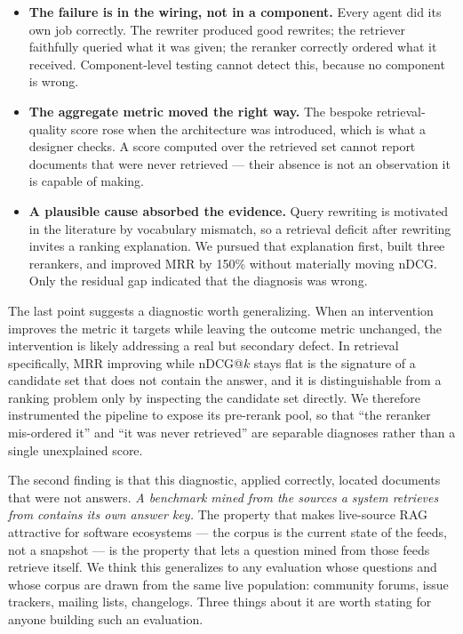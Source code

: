 \documentclass[acmsmall,review,anonymous,screen]{acmart}
\begin{document}
\begin{itemize}
  \item \textbf{The failure is in the wiring, not in a component.} Every agent
  did its own job correctly. The rewriter produced good rewrites; the retriever
  faithfully queried what it was given; the reranker correctly ordered what it
  received. Component-level testing cannot detect this, because no component is
  wrong.

  \item \textbf{The aggregate metric moved the right way.} The bespoke
  retrieval-quality score rose when the architecture was introduced, which is
  what a designer checks. A score computed over the retrieved set cannot report
  documents that were never retrieved --- their absence is not an observation it
  is capable of making.

  \item \textbf{A plausible cause absorbed the evidence.} Query rewriting is
  motivated in the literature by vocabulary mismatch, so a retrieval deficit
  after rewriting invites a ranking explanation. We pursued that explanation
  first, built three rerankers, and improved MRR by 150\% without materially
  moving nDCG. Only the residual gap indicated that the diagnosis was wrong.
\end{itemize}

The last point suggests a diagnostic worth generalizing. When an intervention
improves the metric it targets while leaving the outcome metric unchanged, the
intervention is likely addressing a real but secondary defect. In retrieval
specifically, MRR improving while nDCG@$k$ stays flat is the
signature of a candidate set that does not contain the answer, and it is
distinguishable from a ranking problem only by inspecting the candidate set
directly. We therefore instrumented the pipeline to expose its pre-rerank pool,
so that ``the reranker mis-ordered it'' and ``it was never retrieved'' are
separable diagnoses rather than a single unexplained score.

The second finding is that this diagnostic, applied correctly, located
documents that were not answers. \emph{A benchmark mined from the sources a
system retrieves from contains its own answer key.} The property that makes
live-source RAG attractive for software ecosystems --- the corpus is the
current state of the feeds, not a snapshot --- is the property that lets a
question mined from those feeds retrieve itself. We think this generalizes to
any evaluation whose questions and whose corpus are drawn from the same live
population: community forums, issue trackers, mailing lists, changelogs. Three
things about it are worth stating for anyone building such an evaluation.
\end{document}
